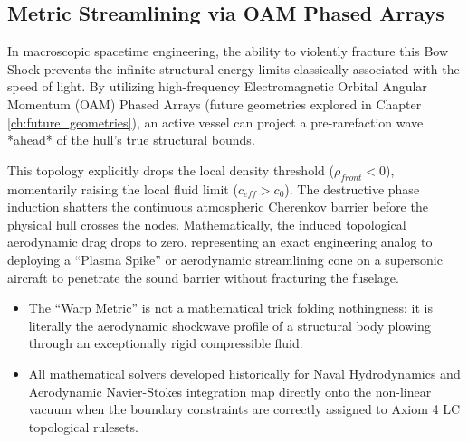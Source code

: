 \subsection{Metric Streamlining via OAM Phased Arrays}

In macroscopic spacetime engineering, the ability to violently fracture this Bow Shock prevents the infinite structural energy limits classically associated with the speed of light. 
By utilizing high-frequency Electromagnetic Orbital Angular Momentum (OAM) Phased Arrays (future geometries explored in Chapter \ref{ch:future_geometries}), an active vessel can project a pre-rarefaction wave *ahead* of the hull's true structural bounds.

This topology explicitly drops the local density threshold ($\rho_{front} < 0$), momentarily raising the local fluid limit ($c_{eff} > c_0$). The destructive phase induction shatters the continuous atmospheric Cherenkov barrier before the physical hull crosses the nodes. Mathematically, the induced topological aerodynamic drag drops to zero, representing an exact engineering analog to deploying a ``Plasma Spike'' or aerodynamic streamlining cone on a supersonic aircraft to penetrate the sound barrier without fracturing the fuselage.

\begin{summarybox}
\begin{itemize}
    \item The ``Warp Metric'' is not a mathematical trick folding nothingness; it is literally the aerodynamic shockwave profile of a structural body plowing through an exceptionally rigid compressible fluid.
    \item All mathematical solvers developed historically for Naval Hydrodynamics and Aerodynamic Navier-Stokes integration map directly onto the non-linear vacuum when the boundary constraints are correctly assigned to Axiom 4 LC topological rulesets.
\end{itemize}
\end{summarybox}
